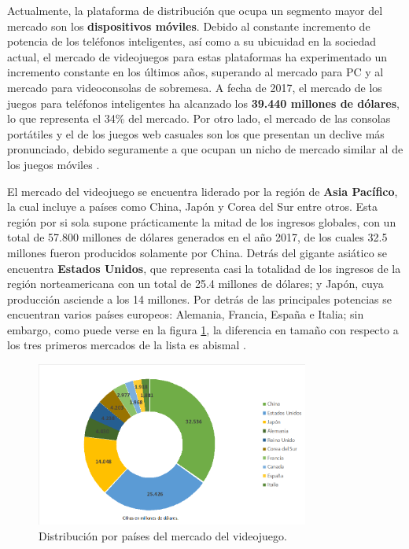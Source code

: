 Actualmente, la plataforma de distribución que ocupa un segmento mayor del mercado son los \textbf{dispositivos móviles}. Debido al constante incremento de potencia de los teléfonos inteligentes, así como a su ubicuidad en la sociedad actual, el mercado de videojuegos para estas plataformas ha experimentado un incremento constante en los últimos años, superando al mercado para PC y al mercado para videoconsolas de sobremesa. A fecha de 2017, el mercado de los juegos para teléfonos inteligentes ha alcanzado los \textbf{39.440 millones de dólares}, lo que representa el 34\% del mercado. Por otro lado, el mercado de las consolas portátiles y el de los juegos web casuales son los que presentan un declive más pronunciado, debido seguramente a que ocupan un nicho de mercado similar al de los juegos móviles \cite{libro_blanco}.

El mercado del videojuego se encuentra liderado por la región de \textbf{Asia Pacífico}, la cual incluye a países como China, Japón y Corea del Sur entre otros. Esta región por si sola supone prácticamente la mitad de los ingresos globales, con un total de 57.800 millones de dólares generados en el año 2017, de los cuales 32.5 millones fueron producidos solamente por China. Detrás del gigante asiático se encuentra \textbf{Estados Unidos}, que representa casi la totalidad de los ingresos de la región norteamericana con un total de 25.4 millones de dólares; y Japón, cuya producción asciende a los 14 millones. Por detrás de las principales potencias se encuentran varios países europeos: Alemania, Francia, España e Italia; sin embargo, como puede verse en la figura \ref{distribucion-mercado-mundial}, la diferencia en tamaño con respecto a los tres primeros mercados de la lista es abismal \cite{libro_blanco}.

\begin{figure}[h]
    \centering
    \includegraphics[width=0.8\textwidth]{images/estadodelarte/mercado/10-mayores-mercados}
    \caption{Distribución por países del mercado del videojuego.}
    \label{distribucion-mercado-mundial}
\end{figure}

